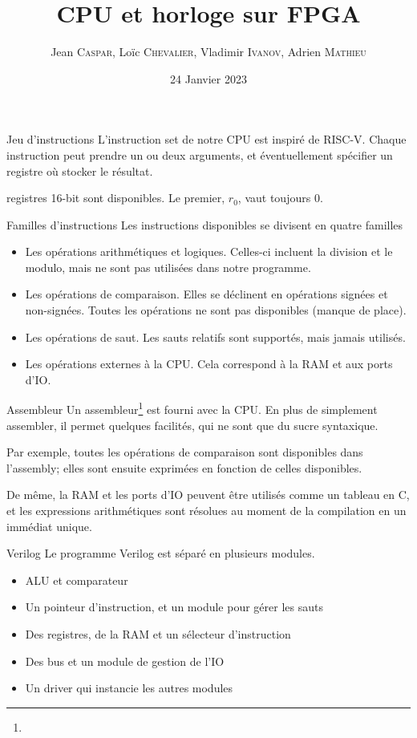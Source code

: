 \documentclass{beamer}
\title{CPU et horloge sur FPGA}
\author[%
J. \textsc{Caspar},
L. \textsc{Chevalier},
V. \textsc{Ivanov},
A. \textsc{Mathieu}%
]{
  Jean \textsc{Caspar},
  Loïc \textsc{Chevalier},
  Vladimir \textsc{Ivanov},
  Adrien \textsc{Mathieu}
}
\date{24 Janvier 2023}
\begin{document}
\begin{frame}[noframenumbering]
  \titlepage
\end{frame}

\begin{frame}[fragile]{Jeu d'instructions}
  L'instruction set de notre CPU est inspiré de RISC-V. Chaque
  instruction peut prendre un ou deux arguments, et éventuellement
  spécifier un registre où stocker le résultat.\par
   registres 16-bit sont disponibles. Le premier, \(r_0\), vaut
  toujours \(0\).
\end{frame}

\begin{frame}[fragile]{Familles d'instructions}
  Les instructions disponibles se divisent en quatre familles\pause
  \begin{itemize}
  \item Les opérations arithmétiques et logiques. Celles-ci incluent
    la division et le modulo, mais ne sont pas utilisées dans notre
    programme.
    \pause
  \item Les opérations de comparaison. Elles se déclinent en opérations
    signées et non-signées. Toutes les opérations ne sont pas
    disponibles (manque de place).
    \pause
  \item Les opérations de saut. Les sauts relatifs sont supportés, mais
    jamais utilisés.
    \pause
  \item Les opérations externes à la CPU. Cela correspond à la RAM et
    aux ports d'IO.
  \end{itemize}
\end{frame}

\begin{frame}{Assembleur}
  Un assembleur\footnote{} est fourni avec la CPU. En plus
  de simplement assembler, il permet quelques facilités, qui ne sont
  que du sucre syntaxique.\par
  \pause
  Par exemple, toutes les opérations de comparaison sont disponibles
  dans l'assembly; elles sont ensuite exprimées en fonction de celles
  disponibles.\par
  \pause
  De même, la RAM et les ports d'IO peuvent être utilisés comme un
  tableau en C, et les expressions arithmétiques sont résolues au
  moment de la compilation en un immédiat unique.
\end{frame}

\begin{frame}{Verilog}
    Le programme Verilog est séparé en plusieurs modules.
    \begin{itemize}
        \item ALU et comparateur
        \item Un pointeur d'instruction, et un module pour gérer les sauts
        \item Des registres, de la RAM et un sélecteur d'instruction
        \item Des bus et un module de gestion de l'IO
        \item Un driver qui instancie les autres modules
    \end{itemize}
\end{frame}
\end{document}
